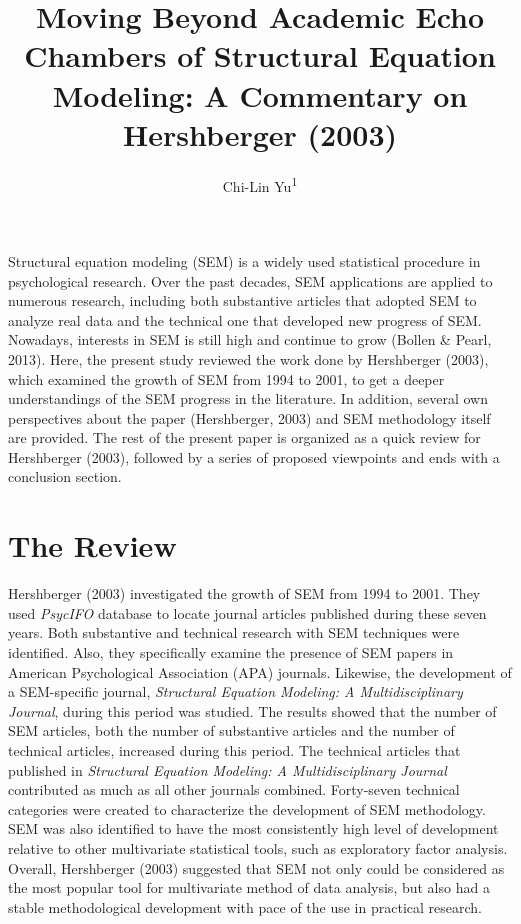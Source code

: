 \documentclass[jou]{apa6}
\title{Moving Beyond Academic Echo Chambers of Structural Equation Modeling: A
Commentary on Hershberger (2003)}
\author{Chi-Lin Yu\textsuperscript{1}}
\affiliation{
    \vspace{0.5cm}
          \textsuperscript{1} Department of Psychology, National Taiwan University  }
\theoremstyle{definition}
\theoremstyle{definition}
\theoremstyle{definition}
\theoremstyle{remark}
\begin{document}
\maketitle

\setcounter{secnumdepth}{0}



Structural equation modeling (SEM) is a widely used statistical
procedure in psychological research. Over the past decades, SEM
applications are applied to numerous research, including both
substantive articles that adopted SEM to analyze real data and the
technical one that developed new progress of SEM. Nowadays, interests in
SEM is still high and continue to grow (Bollen \& Pearl, 2013). Here,
the present study reviewed the work done by Hershberger (2003), which
examined the growth of SEM from 1994 to 2001, to get a deeper
understandings of the SEM progress in the literature. In addition,
several own perspectives about the paper (Hershberger, 2003) and SEM
methodology itself are provided. The rest of the present paper is
organized as a quick review for Hershberger (2003), followed by a series
of proposed viewpoints and ends with a conclusion section.

\hypertarget{the-review}{%
\section{The Review}\label{the-review}}

Hershberger (2003) investigated the growth of SEM from 1994 to 2001.
They used \emph{PsycIFO} database to locate journal articles published
during these seven years. Both substantive and technical research with
SEM techniques were identified. Also, they specifically examine the
presence of SEM papers in American Psychological Association (APA)
journals. Likewise, the development of a SEM-specific journal,
\emph{Structural Equation Modeling: A Multidisciplinary Journal}, during
this period was studied. The results showed that the number of SEM
articles, both the number of substantive articles and the number of
technical articles, increased during this period. The technical articles
that published in \emph{Structural Equation Modeling: A
Multidisciplinary Journal} contributed as much as all other journals
combined. Forty-seven technical categories were created to characterize
the development of SEM methodology. SEM was also identified to have the
most consistently high level of development relative to other
multivariate statistical tools, such as exploratory factor analysis.
Overall, Hershberger (2003) suggested that SEM not only could be
considered as the most popular tool for multivariate method of data
analysis, but also had a stable methodological development with pace of
the use in practical research.
\end{document}
